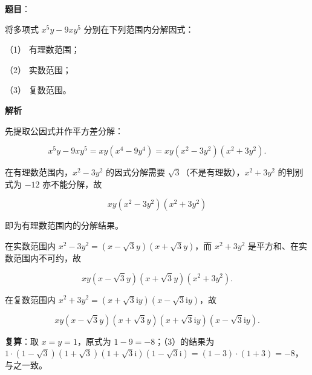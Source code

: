 \begin{answer}

\textbf{题目}：

将多项式 $x^5y-9xy^5$ 分别在下列范围内分解因式：

（1） 有理数范围；

（2） 实数范围；

（3） 复数范围。

\textbf{解析}

先提取公因式并作平方差分解：

\nopagebreak[4]
\[
x^5y-9xy^5=xy\left(x^4-9y^4\right)=xy\left(x^2-3y^2\right)\left(x^2+3y^2\right).
\]


在有理数范围内，$x^2-3y^2$ 的因式分解需要 $\sqrt3$（不是有理数），$x^2+3y^2$ 的判别式为 $-12$ 亦不能分解，故

\nopagebreak[4]
\[
xy\left(x^2-3y^2\right)\left(x^2+3y^2\right)
\]

即为有理数范围内的分解结果。


在实数范围内 $x^2-3y^2=\left(x-\sqrt3y\right)\left(x+\sqrt3y\right)$，而 $x^2+3y^2$ 是平方和、在实数范围内不可约，故

\nopagebreak[4]
\[
xy\left(x-\sqrt3y\right)\left(x+\sqrt3y\right)\left(x^2+3y^2\right).
\]


在复数范围内 $x^2+3y^2=\left(x+\sqrt3\mathrm iy\right)\left(x-\sqrt3\mathrm iy\right)$，故

\nopagebreak[4]
\[
xy\left(x-\sqrt3y\right)\left(x+\sqrt3y\right)\left(x+\sqrt3\mathrm iy\right)\left(x-\sqrt3\mathrm iy\right).
\]

\textbf{复算}：取 $x=y=1$，原式为 $1-9=-8$；（3）的结果为 $1\cdot(1-\sqrt3)(1+\sqrt3)(1+\sqrt3\mathrm i)(1-\sqrt3\mathrm i)=(1-3)\cdot(1+3)=-8$，与之一致。




\end{answer}
